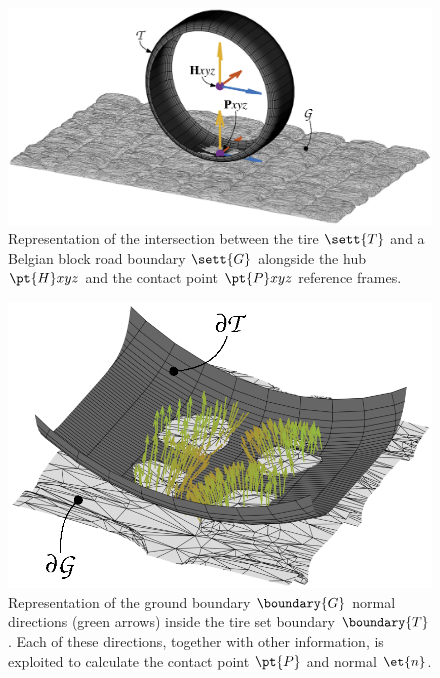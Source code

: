 \begin{figure}[htp]
  \centering
  \includegraphics[width=0.6\columnwidth, trim={5cm 2.3cm 5cm 0cm}, clip]{./figures/chapter_3/road_shell_ipe}
  \caption{Representation of the intersection between the tire $\sett{T}$ and a Belgian block road boundary $\sett{G}$ alongside the hub $\pt{H}xyz$ and the contact point $\pt{P}xyz$ reference frames.}
  \label{chap3:fig:tire_shell}
\end{figure}

\begin{figure}[htp]
  \centering
  \includegraphics[width=0.65\columnwidth]{./figures/chapter_3/zoom_ipe}
  \caption{Representation of the ground boundary $\boundary{G}$ normal directions (green arrows) inside the tire set boundary $\boundary{T}$. Each of these directions, together with other information, is exploited to calculate the contact point $\pt{P}$ and normal $\et{n}$.}
  \label{chap3:fig:zoom}
\end{figure}

